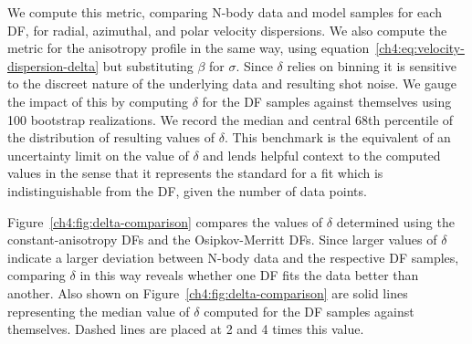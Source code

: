 We compute this metric, comparing N-body data and model samples for each DF, for radial, azimuthal, and polar velocity dispersions. We also compute the metric for the anisotropy profile in the same way, using equation~\eqref{ch4:eq:velocity-dispersion-delta} but substituting $\beta$ for $\sigma$. Since $\delta$ relies on binning it is sensitive to the discreet nature of the underlying data and resulting shot noise. We gauge the impact of this by computing $\delta$ for the DF samples against themselves using 100 bootstrap realizations. We record the median and central 68th percentile of the distribution of resulting values of $\delta$. This benchmark is the equivalent of an uncertainty limit on the value of $\delta$ and lends helpful context to the computed values in the sense that it represents the standard for a fit which is indistinguishable from the DF, given the number of data points.

Figure~\ref{ch4:fig:delta-comparison} compares the values of $\delta$ determined using the constant-anisotropy DFs and the Osipkov-Merritt DFs. Since larger values of $\delta$ indicate a larger deviation between N-body data and the respective DF samples, comparing $\delta$ in this way reveals whether one DF fits the data better than another. Also shown on Figure~\ref{ch4:fig:delta-comparison} are solid lines representing the median value of $\delta$ computed for the DF samples against themselves. Dashed lines are placed at 2 and 4 times this value. 

